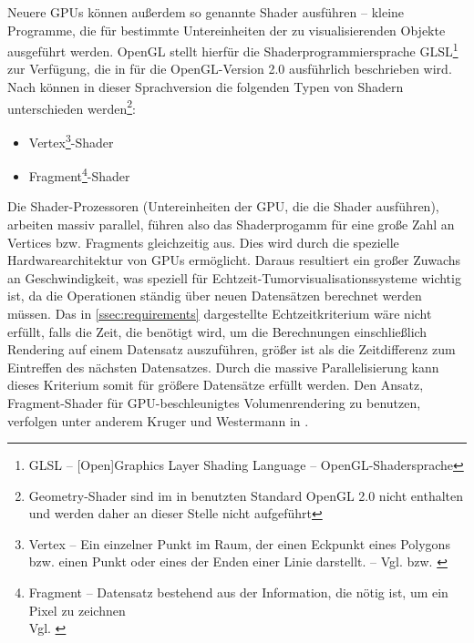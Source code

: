 \documentclass[ngerman,pdftex,paper=A4,DIV=calc,titlepage,12pt]{scrartcl}
\newtheorem[L]{boxedDefinition}{Definition}
\begin{document}
\marginpar[Shader]{}\label{m:shader}Neuere GPUs können außerdem so genannte Shader ausführen -- kleine Programme, die für bestimmte Untereinheiten der zu visualisierenden Objekte ausgeführt werden. OpenGL stellt hierfür die Shaderprogrammiersprache GLSL\footnote{GLSL -- [Open]Graphics Layer Shading Language -- OpenGL-Shadersprache} zur Verfügung, die in \cite{Rost2006} für die OpenGL-Version 2.0 ausführlich beschrieben wird. Nach \cite[Seite 38-47]{Rost2006} können in dieser Sprachversion die folgenden Typen von Shadern unterschieden werden\footnote{Geometry-Shader sind im in \cite{Rost2006} benutzten Standard OpenGL 2.0 nicht enthalten und werden daher an dieser Stelle nicht aufgeführt}:
\begin{itemize}
 \item Vertex\footnote{Vertex -- Ein einzelner Punkt im Raum, der einen Eckpunkt eines Polygons bzw. einen Punkt oder eines der Enden einer Linie darstellt. -- Vgl. \cite[Seite 664]{Wright2000} bzw. \cite[Seite 685]{Rost2006}}-Shader
 \item Fragment\footnote{Fragment -- Datensatz bestehend aus der Information, die nötig ist, um ein Pixel zu zeichnen\\Vgl. \cite[Seite 675]{Rost2006}}-Shader
\end{itemize}
Die Shader-Prozessoren (Untereinheiten der GPU, die die Shader ausführen), arbeiten massiv parallel, führen also das Shaderprogamm für eine große Zahl an Vertices bzw. Fragments gleichzeitig aus. Dies wird durch die spezielle Hardwarearchitektur von GPUs ermöglicht. Daraus resultiert ein großer Zuwachs an Geschwindigkeit, was speziell für Echtzeit-Tumorvisualisationssysteme wichtig ist, da die Operationen ständig über neuen Datensätzen berechnet werden müssen. Das in \vref{ssec:requirements} dargestellte Echtzeitkriterium wäre nicht erfüllt, falls die Zeit, die benötigt wird, um die Berechnungen einschließlich Rendering auf einem Datensatz auszuführen, größer ist als die Zeitdifferenz zum Eintreffen des nächsten Datensatzes. Durch die massive Parallelisierung kann dieses Kriterium somit für größere Datensätze erfüllt werden.
Den Ansatz, Fragment-Shader für GPU-beschleunigtes Volumenrendering zu benutzen, verfolgen unter anderem Kruger und Westermann in \cite{Kruger2003}.
\end{document}
